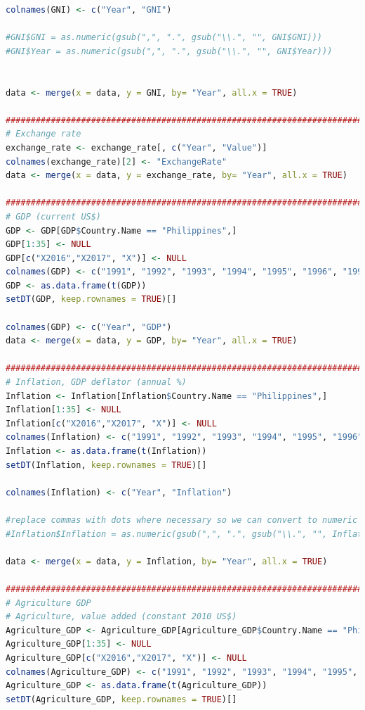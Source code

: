 \documentclass[11pt]{article}
\begin{document}
\begin{lstlisting}[language= R]
colnames(GNI) <- c("Year", "GNI")

#GNI$GNI = as.numeric(gsub(",", ".", gsub("\\.", "", GNI$GNI)))
#GNI$Year = as.numeric(gsub(",", ".", gsub("\\.", "", GNI$Year)))


data <- merge(x = data, y = GNI, by= "Year", all.x = TRUE)

######################################################################################################
# Exchange rate
exchange_rate <- exchange_rate[, c("Year", "Value")]
colnames(exchange_rate)[2] <- "ExchangeRate"
data <- merge(x = data, y = exchange_rate, by= "Year", all.x = TRUE)

####################################################################################################
# GDP (current US$)
GDP <- GDP[GDP$Country.Name == "Philippines",]
GDP[1:35] <- NULL
GDP[c("X2016","X2017", "X")] <- NULL
colnames(GDP) <- c("1991", "1992", "1993", "1994", "1995", "1996", "1997", "1998", "1999", "2000", "2001", "2002", "2003", "2004", "2005", "2006", "2007", "2008", "2009", "2010", "2011", "2012", "2013", "2014", "2015")
GDP <- as.data.frame(t(GDP))
setDT(GDP, keep.rownames = TRUE)[]

colnames(GDP) <- c("Year", "GDP")
data <- merge(x = data, y = GDP, by= "Year", all.x = TRUE)

##################################################################################################
# Inflation, GDP deflator (annual %)
Inflation <- Inflation[Inflation$Country.Name == "Philippines",]
Inflation[1:35] <- NULL
Inflation[c("X2016","X2017", "X")] <- NULL
colnames(Inflation) <- c("1991", "1992", "1993", "1994", "1995", "1996", "1997", "1998", "1999", "2000", "2001", "2002", "2003", "2004", "2005", "2006", "2007", "2008", "2009", "2010", "2011", "2012", "2013", "2014", "2015")
Inflation <- as.data.frame(t(Inflation))
setDT(Inflation, keep.rownames = TRUE)[]

colnames(Inflation) <- c("Year", "Inflation")

#replace commas with dots where necessary so we can convert to numeric
#Inflation$Inflation = as.numeric(gsub(",", ".", gsub("\\.", "", Inflation$Inflation)))

data <- merge(x = data, y = Inflation, by= "Year", all.x = TRUE)

####################################################################################################
# Agriculture GDP
# Agriculture, value added (constant 2010 US$)
Agriculture_GDP <- Agriculture_GDP[Agriculture_GDP$Country.Name == "Philippines",]
Agriculture_GDP[1:35] <- NULL
Agriculture_GDP[c("X2016","X2017", "X")] <- NULL
colnames(Agriculture_GDP) <- c("1991", "1992", "1993", "1994", "1995", "1996", "1997", "1998", "1999", "2000", "2001", "2002", "2003", "2004", "2005", "2006", "2007", "2008", "2009", "2010", "2011", "2012", "2013", "2014", "2015")
Agriculture_GDP <- as.data.frame(t(Agriculture_GDP))
setDT(Agriculture_GDP, keep.rownames = TRUE)[]


\end{lstlisting}
\end{document}
